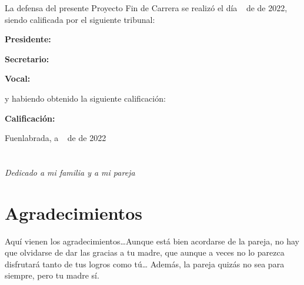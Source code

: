 \documentclass[a4paper, 12pt]{book}
\begin{document}
\vspace{1cm}
La defensa del presente Proyecto Fin de Carrera se realizó el día \qquad$\;\,$ de \qquad\qquad\qquad\qquad \newline de 2022, siendo calificada por el siguiente tribunal:


\vspace{0.5cm}
\textbf{Presidente:}

\vspace{1.2cm}
\textbf{Secretario:}

\vspace{1.2cm}
\textbf{Vocal:}


\vspace{1.2cm}
y habiendo obtenido la siguiente calificación:

\vspace{1cm}
\textbf{Calificación:}


\vspace{1cm}
\begin{flushright}
Fuenlabrada, a \qquad$\;\,$ de \qquad\qquad\qquad\qquad de 2022
\end{flushright}


\chapter*{}
\begin{flushright}
\textit{Dedicado a mi familia y a mi pareja}
\end{flushright}


\chapter*{Agradecimientos}

Aquí vienen los agradecimientos\ldots Aunque está bien acordarse de la pareja, no hay que olvidarse de dar las gracias a tu madre, que aunque a veces no lo parezca disfrutará tanto de tus logros como tú\ldots
Además, la pareja quizás no sea para siempre, pero tu madre sí.
\end{document}
